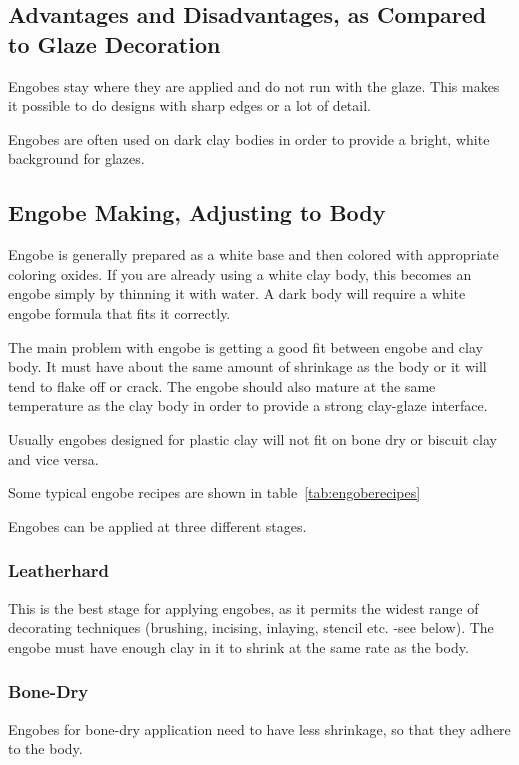 \subsection{Advantages and Disadvantages, as Compared to Glaze Decoration}
Engobes stay where they are applied and do not run with the glaze. This makes 
it possible to do designs with sharp edges or a lot of detail.

Engobes are often used on dark clay bodies in order to provide a bright, white 
background for glazes.
\subsection{Engobe Making, Adjusting to Body}
Engobe is generally prepared as a white base and then colored with appropriate 
coloring oxides. If you are already using a white clay body, this becomes an 
engobe simply by thinning it with water. A dark body will require a white 
engobe formula that fits it correctly.

The main problem with engobe is getting a good fit between engobe and clay 
body. It must have about the same amount of shrinkage as the body or it will 
tend to flake off or crack. The engobe should also mature at the same 
temperature as the clay body in order to provide a strong clay-glaze interface. 

Usually engobes designed for plastic clay will not fit on bone dry or biscuit 
clay and vice versa.

Some typical engobe recipes are shown in table~\ref{tab:engoberecipes}

Engobes can be applied at three different stages.
\subsubsection{Leatherhard}
This is the best stage for applying engobes, as it permits the widest range of 
decorating techniques (brushing, incising, inlaying, stencil etc. -see below). 
The engobe must have enough clay in it to shrink at the same rate as the body.
\subsubsection{Bone-Dry}
Engobes for bone-dry application need to have less shrinkage, so that they 
adhere to the body.
